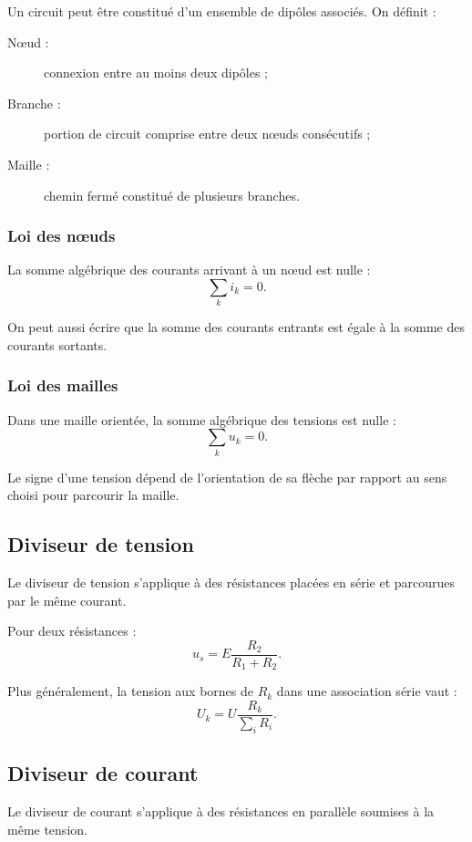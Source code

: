 Un circuit peut être constitué d'un ensemble de dipôles associés. On définit :
\begin{description}
  \item[Nœud :] connexion entre au moins deux dipôles ;
  \item[Branche :] portion de circuit comprise entre deux nœuds consécutifs ;
  \item[Maille :] chemin fermé constitué de plusieurs branches.
\end{description}

\subsubsection{Loi des nœuds}

La somme algébrique des courants arrivant à un nœud est nulle :
\[
\sum_k i_k=0.
\]

On peut aussi écrire que la somme des courants entrants est égale à la somme des courants sortants.

\subsubsection{Loi des mailles}

Dans une maille orientée, la somme algébrique des tensions est nulle :
\[
\sum_k u_k=0.
\]

Le signe d'une tension dépend de l'orientation de sa flèche par rapport au sens choisi pour parcourir la maille.

\subsection{Diviseur de tension}

Le diviseur de tension s'applique à des résistances placées en série et parcourues par le même courant.

\TLPontDiviseur

Pour deux résistances :
\[
u_s=E\frac{R_2}{R_1+R_2}.
\]

Plus généralement, la tension aux bornes de $R_k$ dans une association série vaut :
\[
U_k=U\frac{R_k}{\sum_i R_i}.
\]

\subsection{Diviseur de courant}

Le diviseur de courant s'applique à des résistances en parallèle soumises à la même tension.

